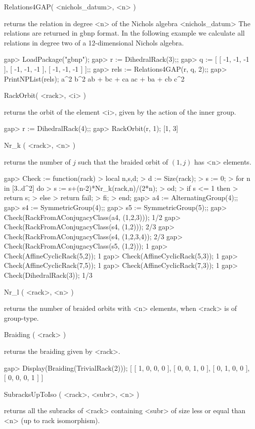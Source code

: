 \> Relations4GAP( <nichols_datum>, <n> )

returns the relation in degree <n> of the Nichols algebra <nichols_datum> The
relations are returned in gbnp format.  In the following example we calculate
all relations in degree two of a 12-dimensional Nichols algebra.

\beginexample
gap> LoadPackage("gbnp");
gap> r := DihedralRack(3);;
gap> q := [ [ -1, -1, -1 ], [ -1, -1, -1 ], [ -1, -1, -1 ] ];;
gap> rels := Relations4GAP(r, q, 2);;
gap> PrintNPList(rels);
 a^2 
 b^2 
 ab + bc + ca 
 ac + ba + cb 
 c^2 
\endexample

\> RackOrbit( <rack>, <i> )

returns the orbit of the element <i>, given by the action of the inner group.

\beginexample
gap> r := DihedralRack(4);;
gap> RackOrbit(r, 1);
[1, 3]
\endexample

\>Nr_k ( <rack>, <n> )

returns the number of $j$ such that the braided orbit of $(1,j)$ 
has <n> elements.

\beginexample
gap> Check := function(rack)
> local n,s,d;
> d := Size(rack);
> s := 0;
> for n in [3..d^2] do
>   s := s+(n-2)*Nr_k(rack,n)/(2*n);
> od;
> if s <= 1 then
>   return s;
> else
>   return fail;
> fi;
> end;
gap> a4 := AlternatingGroup(4);;
gap> s4 := SymmetricGroup(4);;
gap> s5 := SymmetricGroup(5);;
gap> Check(RackFromAConjugacyClass(a4, (1,2,3)));
1/2
gap> Check(RackFromAConjugacyClass(s4, (1,2)));    
2/3
gap> Check(RackFromAConjugacyClass(s4, (1,2,3,4));
2/3
gap> Check(RackFromAConjugacyClass(s5, (1,2)));    
1
gap> Check(AffineCyclicRack(5,2));                            
1
gap> Check(AffineCyclicRack(5,3));
1
gap> Check(AffineCyclicRack(7,5));  
1
gap> Check(AffineCyclicRack(7,3));
1
gap> Check(DihedralRack(3));      
1/3
\endexample

\>Nr_l ( <rack>, <n> )

returns the number of braided orbits with <n> elements, when <rack> is of
group-type.

\>Braiding ( <rack> )

returns the braiding given by <rack>.

\beginexample
gap> Display(Braiding(TrivialRack(2)));  
[ [  1,  0,  0,  0 ],
  [  0,  0,  1,  0 ],
  [  0,  1,  0,  0 ],
  [  0,  0,  0,  1 ] ]
\endexample

\>SubracksUpToIso ( <rack>, <subr>, <n> )

returns all the subracks of <rack> containing <subr> of size less or equal than
<n> (up to rack isomorphism).

